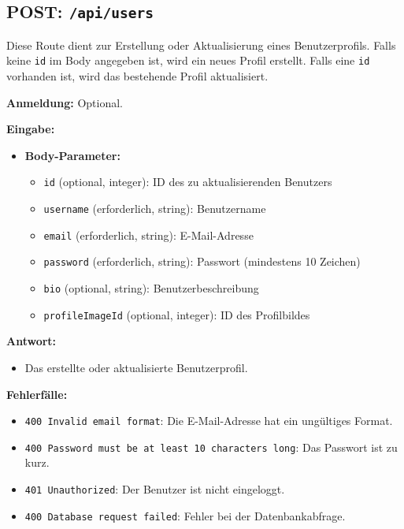 \documentclass[a4paper,12pt]{article}
\begin{document}
\subsection{POST: \texttt{/api/users}}

Diese Route dient zur Erstellung oder Aktualisierung eines Benutzerprofils.
Falls keine \texttt{id} im Body angegeben ist, wird ein neues Profil erstellt.
Falls eine \texttt{id} vorhanden ist, wird das bestehende Profil aktualisiert.

\textbf{Anmeldung:} Optional.

\textbf{Eingabe:}
\begin{itemize}
    \item \textbf{Body-Parameter:}
    \begin{itemize}
        \item \texttt{id} (optional, integer):
            ID des zu aktualisierenden Benutzers
        \item \texttt{username} (erforderlich, string):
            Benutzername
        \item \texttt{email} (erforderlich, string):
            E-Mail-Adresse
        \item \texttt{password} (erforderlich, string):
            Passwort (mindestens 10 Zeichen)
        \item \texttt{bio} (optional, string):
            Benutzerbeschreibung
        \item \texttt{profileImageId} (optional, integer):
            ID des Profilbildes
    \end{itemize}
\end{itemize}

\textbf{Antwort:}
\begin{itemize}
    \item Das erstellte oder aktualisierte Benutzerprofil.
\end{itemize}

\textbf{Fehlerfälle:}
\begin{itemize}
    \item \texttt{400 Invalid email format}:
        Die E-Mail-Adresse hat ein ungültiges Format.
    \item \texttt{400 Password must be at least 10 characters long}:
        Das Passwort ist zu kurz.
    \item \texttt{401 Unauthorized}:
        Der Benutzer ist nicht eingeloggt.
    \item \texttt{400 Database request failed}:
        Fehler bei der Datenbankabfrage.
\end{itemize}
\end{document}
